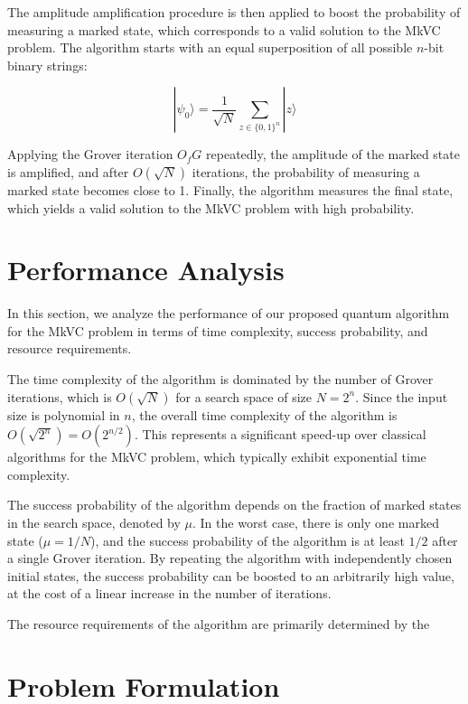 The amplitude amplification procedure is then applied to boost the probability of measuring a marked state, which corresponds to a valid solution to the MkVC problem. The algorithm starts with an equal superposition of all possible $n$-bit binary strings:

\begin{equation}
|\psi_0\rangle = \frac{1}{\sqrt{N}} \sum_{z \in \{0, 1\}^n} |z\rangle
\end{equation}

Applying the Grover iteration $O_f G$ repeatedly, the amplitude of the marked state is amplified, and after $O(\sqrt{N})$ iterations, the probability of measuring a marked state becomes close to 1. Finally, the algorithm measures the final state, which yields a valid solution to the MkVC problem with high probability.

\section{Performance Analysis}\label{sec:analysis}

In this section, we analyze the performance of our proposed quantum algorithm for the MkVC problem in terms of time complexity, success probability, and resource requirements.

The time complexity of the algorithm is dominated by the number of Grover iterations, which is $O(\sqrt{N})$ for a search space of size $N=2^n$. Since the input size is polynomial in $n$, the overall time complexity of the algorithm is $O(\sqrt{2^n}) = O(2^{n/2})$. This represents a significant speed-up over classical algorithms for the MkVC problem, which typically exhibit exponential time complexity.

The success probability of the algorithm depends on the fraction of marked states in the search space, denoted by $\mu$. In the worst case, there is only one marked state ($\mu = 1/N$), and the success probability of the algorithm is at least $1/2$ after a single Grover iteration. By repeating the algorithm with independently chosen initial states, the success probability can be boosted to an arbitrarily high value, at the cost of a linear increase in the number of iterations.

The resource requirements of the algorithm are primarily determined by the

\section{Problem Formulation}

